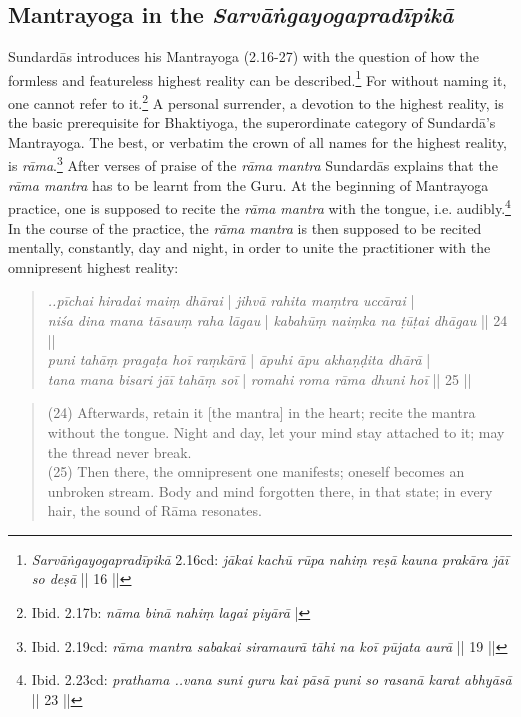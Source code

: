 \subsection{Mantrayoga in the \textit{Sarvāṅgayogapradīpikā}}
\label{mantrayogaintrosarva}

Sundardās introduces his Mantrayoga (2.16-27) with the question of how the formless and featureless highest reality can be described.\footnote{\textit{Sarvāṅgayogapradīpikā} 2.16cd: \textit{jākai kachū rūpa nahiṃ reṣā} \textit{kauna prakāra jāī so deṣā} || 16 ||} For without naming it, one cannot refer to it.\footnote{Ibid. 2.17b: \textit{nāma binā nahiṃ lagai piyārā} |} A personal surrender, a devotion to the highest reality, is the basic prerequisite for Bhaktiyoga, the superordinate category of Sundardā's Mantrayoga. The best, or verbatim the crown of all names for the highest reality, is \textit{rāma}.\footnote{Ibid. 2.19cd: \textit{rāma mantra sabakai siramaurā} \textit{tāhi na koī pūjata aurā} || 19 ||} After verses of praise of the \textit{rāma mantra} Sundardās explains that the \textit{rāma mantra} has to be learnt from the Guru. At the beginning of Mantrayoga practice, one is supposed to recite the \textit{rāma mantra} with the tongue, i.e. audibly.\footnote{Ibid. 2.23cd: \textit{prathama ..vana suni guru kai pāsā} \textit{puni so rasanā karat abhyāsā} || 23 ||} In the course of the practice, the \textit{rāma mantra} is then supposed to be recited mentally, constantly, day and night, in order to unite the practitioner with the omnipresent highest reality:

\begin{quote}
\textit{..pīchai hiradai maiṃ dhārai} | \textit{jihvā rahita maṃtra uccārai} |\\ 
\textit{niśa dina mana tāsauṃ raha lāgau} | \textit{kabahūṃ naiṃka na ṭūṭai dhāgau} || 24 ||\\
\textit{puni tahāṃ pragaṭa hoī raṃkārā} | \textit{āpuhi āpu akhaṇḍita dhārā} |\\
\textit{tana mana bisari jāī tahāṃ soī} | \textit{romahi roma rāma dhuni hoī} || 25 ||\\
\end{quote}
\begin{quote}
(24) Afterwards, retain it [the mantra] in the heart; recite the mantra without the tongue.
Night and day, let your mind stay attached to it; may the thread never break.\\
(25) Then there, the omnipresent one manifests; oneself becomes an unbroken stream.
Body and mind forgotten there, in that state; in every hair, the sound of Rāma resonates.
\end{quote}

